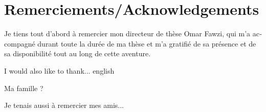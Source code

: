 \thispagestyle{empty}
\chapter*{Remerciements/Acknowledgements}

\begin{otherlanguage}{french}
  Je tiens tout d'abord à remercier mon directeur de thèse Omar Fawzi, qui m'a accompagné durant toute la durée de ma thèse et m'a gratifié de sa présence et de sa disponibilité tout au long de cette aventure.
\end{otherlanguage}

I would also like to thank... english

\begin{otherlanguage}{french}
  Ma famille ?
\end{otherlanguage}

\begin{otherlanguage}{french}
  Je tenais aussi à remercier mes amis...
\end{otherlanguage}
